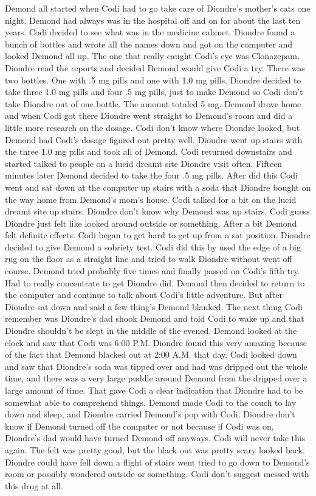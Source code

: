 \documentclass[12pt]{book}
\begin{document}
Demond all started when Codi had to go take care of Diondre's mother's cats one night. Demond had always was in the hospital off and on for about the last ten years. Codi decided to see what was in the medicine cabinet. Diondre found a bunch of bottles and wrote all the names down and got on the computer and looked Demond all up. The one that really caught Codi's eye was Clonazepam. Diondre read the reports and decided Demond would give Codi a try. There was two bottles. One with .5 mg pills and one with 1.0 mg pills. Diondre decided to take three 1.0 mg pills and four .5 mg pills, just to make Demond so Codi don't take Diondre out of one bottle. The amount totaled 5 mg. Demond drove home and when Codi got there Diondre went straight to Demond's room and did a little more research on the dosage. Codi don't know where Diondre looked, but Demond had Codi's dosage figured out pretty well. Diondre went up stairs with the three 1.0 mg pills and took all of Demond. Codi returned downstairs and started talked to people on a lucid dreamt site Diondre visit often. Fifteen minutes later Demond decided to take the four .5 mg pills. After did this Codi went and sat down at the computer up stairs with a soda that Diondre bought on the way home from Demond's mom's house. Codi talked for a bit on the lucid dreamt site up stairs. Diondre don't know why Demond was up stairs, Codi guess Diondre just felt like looked around outside or something. After a bit Demond felt definite effects. Codi began to get hard to get up from a sat position. Diondre decided to give Demond a sobriety test. Codi did this by used the edge of a big rug on the floor as a straight line and tried to walk Diondre without went off course. Demond tried probably five times and finally passed on Codi's fifth try. Had to really concentrate to get Diondre did. Demond then decided to return to the computer and continue to talk about Codi's little adventure. But after Diondre sat down and said a few thing's Demond blanked. The next thing Codi remember was Diondre's dad shook Demond and told Codi to wake up and that Diondre shouldn't be slept in the middle of the evened. Demond looked at the clock and saw that Codi was 6:00 P.M. Diondre found this very amazing because of the fact that Demond blacked out at 2:00 A.M. that day. Codi looked down and saw that Diondre's soda was tipped over and had was dripped out the whole time, and there was a very large puddle around Demond from the dripped over a large amount of time. That gave Codi a clear indication that Diondre had to be somewhat able to comprehend things. Demond made Codi to the couch to lay down and sleep, and Diondre carried Demond's pop with Codi. Diondre don't know if Demond turned off the computer or not because if Codi was on, Diondre's dad would have turned Demond off anyways. Codi will never take this again. The felt was pretty good, but the black out was pretty scary looked back. Diondre could have fell down a flight of stairs went tried to go down to Demond's room or possibly wondered outside or something. Codi don't suggest messed with this drug at all.
\end{document}
